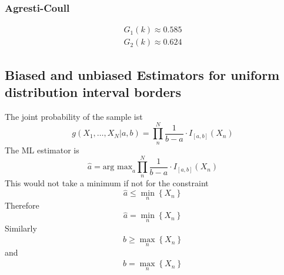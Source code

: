 \subsubsection{Agresti-Coull}
\begin{align}
    G_1\left(k\right)\approx 0.585
    \\G_2\left(k\right)\approx 0.624
\end{align}
\subsection{Biased and unbiased Estimators for uniform distribution interval borders}
The joint probability of the sample ist
\begin{equation}
    g\left(X_1,\dots,X_N\vert a,b\right)=\prod_n^N \frac{1}{b-a}\cdot I_{\left[a,b\right]}\left(X_n\right)
\end{equation}
The ML estimator is
\begin{equation}
    \hat{a}=\text{arg max}_a\prod_{n}^{N}\frac{1}{b-a}\cdot I_{\left[a,b\right]}\left(X_n\right)
\end{equation}
This would not take a minimum if not for the constraint
\begin{equation}
    \hat{a}\leq\min_n\left\{X_n\right\}
\end{equation}
Therefore
\begin{equation}
    \hat{a}=\min_n\left\{X_n\right\}
\end{equation}
Similarly
\begin{equation}
    \hat{b}\geq\max_n\left\{X_n\right\}
\end{equation}
and
\begin{equation}
    \hat{b}=\max_n\left\{X_n\right\}
\end{equation}
